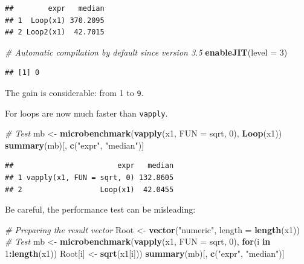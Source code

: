 \documentclass[
  12pt,
  american,
  a4paper,
  extrafontsizes,onecolumn,openright
  ]{memoir}
\newenvironment{Shaded}{\begin{snugshade}}{\end{snugshade}}
\newcommand{\AttributeTok}[1]{\textcolor[rgb]{0.13,0.29,0.53}{#1}}
\newcommand{\CommentTok}[1]{\textcolor[rgb]{0.56,0.35,0.01}{\textit{#1}}}
\newcommand{\ControlFlowTok}[1]{\textcolor[rgb]{0.13,0.29,0.53}{\textbf{#1}}}
\newcommand{\DecValTok}[1]{\textcolor[rgb]{0.00,0.00,0.81}{#1}}
\newcommand{\FunctionTok}[1]{\textcolor[rgb]{0.13,0.29,0.53}{\textbf{#1}}}
\newcommand{\NormalTok}[1]{#1}
\newcommand{\OtherTok}[1]{\textcolor[rgb]{0.56,0.35,0.01}{#1}}
\newcommand{\SpecialCharTok}[1]{\textcolor[rgb]{0.81,0.36,0.00}{\textbf{#1}}}
\newcommand{\StringTok}[1]{\textcolor[rgb]{0.31,0.60,0.02}{#1}}
\newlength{\rf}
\begin{document}
\begin{verbatim}
##        expr   median
## 1  Loop(x1) 370.2095
## 2 Loop2(x1)  42.7015
\end{verbatim}

\begin{Shaded}
\begin{Highlighting}[]
\CommentTok{\# Automatic compilation by default since version 3.5}
\FunctionTok{enableJIT}\NormalTok{(}\AttributeTok{level =} \DecValTok{3}\NormalTok{)}
\end{Highlighting}
\end{Shaded}

\begin{verbatim}
## [1] 0
\end{verbatim}

\normalsize

The gain is considerable: from 1 to \texttt{9}.

For loops are now much faster than \texttt{vapply}.

\scriptsize

\begin{Shaded}
\begin{Highlighting}[]
\CommentTok{\# Test}
\NormalTok{mb }\OtherTok{\textless{}{-}} \FunctionTok{microbenchmark}\NormalTok{(}\FunctionTok{vapply}\NormalTok{(x1, }\AttributeTok{FUN =}\NormalTok{ sqrt, }\DecValTok{0}\NormalTok{), }\FunctionTok{Loop}\NormalTok{(x1))}
\FunctionTok{summary}\NormalTok{(mb)[, }\FunctionTok{c}\NormalTok{(}\StringTok{"expr"}\NormalTok{, }\StringTok{"median"}\NormalTok{)]}
\end{Highlighting}
\end{Shaded}

\begin{verbatim}
##                        expr   median
## 1 vapply(x1, FUN = sqrt, 0) 132.8605
## 2                  Loop(x1)  42.0455
\end{verbatim}

\normalsize

Be careful, the performance test can be misleading:

\scriptsize

\begin{Shaded}
\begin{Highlighting}[]
\CommentTok{\# Preparing the result vector}
\NormalTok{Root }\OtherTok{\textless{}{-}} \FunctionTok{vector}\NormalTok{(}\StringTok{"numeric"}\NormalTok{, }\AttributeTok{length =} \FunctionTok{length}\NormalTok{(x1))}
\CommentTok{\# Test}
\NormalTok{mb }\OtherTok{\textless{}{-}} \FunctionTok{microbenchmark}\NormalTok{(}\FunctionTok{vapply}\NormalTok{(x1, }\AttributeTok{FUN =}\NormalTok{ sqrt, }\DecValTok{0}\NormalTok{), }
                     \ControlFlowTok{for}\NormalTok{(i }\ControlFlowTok{in} \DecValTok{1}\SpecialCharTok{:}\FunctionTok{length}\NormalTok{(x1)) }
\NormalTok{                       Root[i] }\OtherTok{\textless{}{-}} \FunctionTok{sqrt}\NormalTok{(x1[i]))}
\FunctionTok{summary}\NormalTok{(mb)[, }\FunctionTok{c}\NormalTok{(}\StringTok{"expr"}\NormalTok{, }\StringTok{"median"}\NormalTok{)]}
\end{Highlighting}
\end{Shaded}
\end{document}
